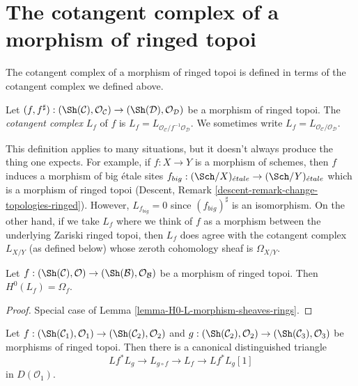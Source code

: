 \section{The cotangent complex of a morphism of ringed topoi}
\label{section-cotangent-morphism-ringed-topoi}

\noindent
The cotangent complex of a morphism of ringed topoi is defined
in terms of the cotangent complex we defined above.

\begin{definition}
\label{definition-cotangent-complex-morphism-ringed-topoi}
Let $(f, f^\sharp) : (\Sh(\mathcal{C}), \mathcal{O}_\mathcal{C}) \to
(\Sh(\mathcal{D}), \mathcal{O}_\mathcal{D})$ be a morphism of ringed topoi.
The {\it cotangent complex} $L_f$ of $f$ is
$L_f = L_{\mathcal{O}_\mathcal{C}/f^{-1}\mathcal{O}_\mathcal{D}}$.
We sometimes write $L_f = L_{\mathcal{O}_\mathcal{C}/\mathcal{O}_\mathcal{D}}$.
\end{definition}

\noindent
This definition applies to many situations, but it doesn't always produce
the thing one expects. For example, if $f : X \to Y$ is a morphism of
schemes, then $f$ induces a morphism of big \'etale sites
$f_{big} : (\Sch/X)_{\acute{e}tale} \to (\Sch/Y)_{\acute{e}tale}$
which is a morphism of ringed topoi (Descent, Remark
\ref{descent-remark-change-topologies-ringed}).
However, $L_{f_{big}} = 0$ since $(f_{big})^\sharp$ is an isomorphism.
On the other hand, if we take $L_f$ where we think of $f$ as a morphism
between the underlying Zariski ringed topoi, then $L_f$ does agree with
the cotangent complex $L_{X/Y}$ (as defined below)
whose zeroth cohomology sheaf is $\Omega_{X/Y}$.

\begin{lemma}
\label{lemma-H0-L-morphism-ringed-topoi}
Let $f : (\Sh(\mathcal{C}), \mathcal{O}) \to
(\Sh(\mathcal{B}), \mathcal{O}_\mathcal{B})$ be a morphism of
ringed topoi. Then $H^0(L_f) = \Omega_f$.
\end{lemma}

\begin{proof}
Special case of Lemma \ref{lemma-H0-L-morphism-sheaves-rings}.
\end{proof}

\begin{lemma}
\label{lemma-triangle-ringed-topoi}
Let $f : (\Sh(\mathcal{C}_1), \mathcal{O}_1) \to
(\Sh(\mathcal{C}_2), \mathcal{O}_2)$ and
$g : (\Sh(\mathcal{C}_2), \mathcal{O}_2) \to
(\Sh(\mathcal{C}_3), \mathcal{O}_3)$ be morphisms of ringed topoi.
Then there is a canonical distinguished triangle
$$
Lf^* L_g \to L_{g \circ f} \to L_f \to Lf^*L_g[1]
$$
in $D(\mathcal{O}_1)$.
\end{lemma}


